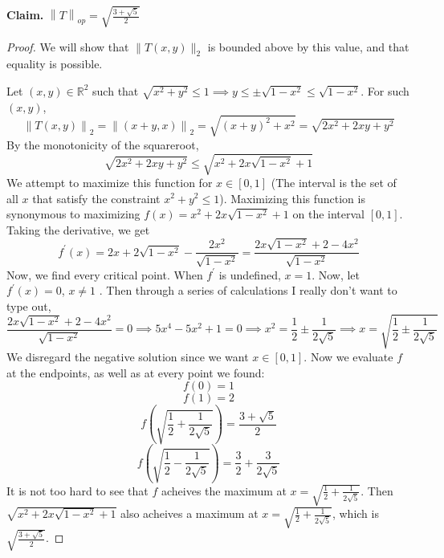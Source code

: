 \documentclass{article}
\theoremstyle{plain} %
\numberwithin{thm}{section} %
\theoremstyle{definition}
\begin{document}
\begin{enumerate}[label=(\alph*)]
            \textbf{Claim.} \(\left\lVert T \right\rVert _{op} = \sqrt{\frac{3+\sqrt{5}}{2}} \)

            \begin{proof}
                We will show that \(\|T(x,y)\| _2\) is bounded above by this value, and that equality is possible.
                
                Let \((x,y) \in \mathbb{R} ^2\) such that \(\sqrt{x^2 + y^2} \leq 1 \implies y \leq \pm \sqrt{1-x^2} \leq \sqrt{1-x^2}\).
                For such \((x,y)\),
                \[
                    \left\lVert T(x,y) \right\rVert _2 = \left\lVert (x+y, x) \right\rVert _2 = \sqrt{(x+y)^2 + x^2} = \sqrt{2x^2 + 2xy + y^2} 
                \]
                By the monotonicity of the squareroot,
                \[
                    \sqrt{2x^2 + 2xy + y^2} \leq \sqrt{x^2 + 2x\sqrt{1-x^2} + 1}
                \]
                We attempt to maximize this function for \(x \in [0,1]\) (The interval is the set of all \(x\) that satisfy the constraint \(x^2 + y^2 \leq 1\)). Maximizing this function is synonymous to maximizing \(f(x) = x^2 + 2x\sqrt{1-x^2} + 1\) on the interval \([0,1]\). Taking the derivative, we get
                \[
                    f^\prime(x) = 2x + 2\sqrt{1-x^2} -\frac{2x^2}{\sqrt{1-x^2}} = \frac{2x\sqrt{1-x^2} + 2 - 4x^2}{\sqrt{1-x^2}}
                \]
                Now, we find every critical point. When \(f^\prime\) is undefined, \(x = 1\).
                Now, let \(f^\prime(x) = 0\), \(x\neq 1\) . Then through a series of calculations I really don't want to type out,
                \[
                    \frac{2x\sqrt{1-x^2} + 2 - 4x^2}{\sqrt{1-x^2}} = 0 \implies 5x^4 - 5x^2 + 1 = 0 \implies x^2 = \frac{1}{2}\pm\frac{1}{2\sqrt{5}} \implies x = \sqrt{\frac{1}{2}\pm\frac{1}{2\sqrt{5}}} 
                \]
                We disregard the negative solution since we want \(x \in [0,1]\).
                Now we evaluate \(f\) at the endpoints, as well as at every point we found:
                \[
                    f(0) = 1
                \]
                \[
                    f(1) = 2
                \]
                \[
                    f\left(\sqrt{\frac{1}{2}+\frac{1}{2\sqrt{5}}}\right) = \frac{3+\sqrt{5}}{2}
                \]
                \[
                    f\left(\sqrt{\frac{1}{2}-\frac{1}{2\sqrt{5}}}\right) = \frac{3}{2}+\frac{3}{2\sqrt{5}}
                \]
                It is not too hard to see that \(f\) acheives the maximum at \(x = \sqrt{\frac{1}{2}+\frac{1}{2\sqrt{5}}}\). Then \(\sqrt{x^2 + 2x\sqrt{1-x^2} + 1}\) also acheives a maximum at \(x = \sqrt{\frac{1}{2}+\frac{1}{2\sqrt{5}}}\), which is \(\sqrt{\frac{3+\sqrt{5}}{2}}\).


\end{proof}
\end{enumerate}
\end{document}
